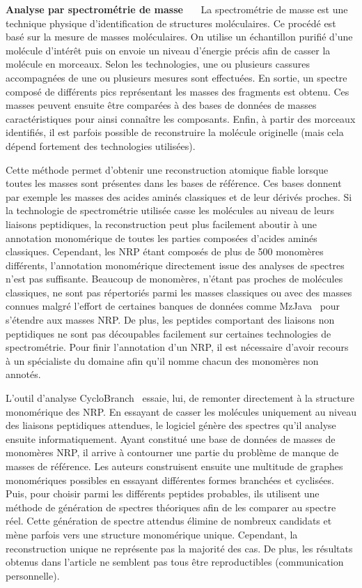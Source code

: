 \textbf{Analyse par spectrométrie de masse}~~~
La spectrométrie de masse est une technique physique d'identification de structures moléculaires.
Ce procédé est basé sur la mesure de masses moléculaires.
On utilise un échantillon purifié d'une molécule d'intérêt puis on envoie un niveau d'énergie précis afin de casser la molécule en morceaux.
Selon les technologies, une ou plusieurs cassures accompagnées de une ou plusieurs mesures sont effectuées.
En sortie, un spectre composé de différents pics représentant les masses des fragments est obtenu.
Ces masses peuvent ensuite être comparées à des bases de données de masses caractéristiques pour ainsi connaître les composants.
Enfin, à partir des morceaux identifiés, il est parfois possible de reconstruire la molécule originelle (mais cela dépend fortement des technologies utilisées).

Cette méthode permet d'obtenir une reconstruction atomique fiable lorsque toutes les masses sont présentes dans les bases de référence.
Ces bases donnent par exemple les masses des acides aminés classiques et de leur dérivés proches.
Si la technologie de spectrométrie utilisée casse les molécules au niveau de leurs liaisons peptidiques, la reconstruction peut plus facilement aboutir à une annotation monomérique de toutes les parties composées d'acides aminés classiques.
Cependant, les NRP étant composés de plus de 500 monomères différents, l'annotation monomérique directement issue des analyses de spectres n'est pas suffisante.
Beaucoup de monomères, n'étant pas proches de molécules classiques, ne sont pas répertoriés parmi les masses classiques ou avec des masses connues malgré l'effort de certaines banques de données comme MzJava~\cite{horlacher_mzjava:_2015} pour s'étendre aux masses NRP.
De plus, les peptides comportant des liaisons non peptidiques ne sont pas découpables facilement sur certaines technologies de spectrométrie.
Pour finir l'annotation d'un NRP, il est nécessaire d'avoir recours à un spécialiste du domaine afin qu'il nomme chacun des monomères non annotés.

L'outil d'analyse CycloBranch~\cite{novak_cyclobranch:_2015} essaie, lui, de remonter directement à la structure monomérique des NRP.
En essayant de casser les molécules uniquement au niveau des liaisons peptidiques attendues, le logiciel génère des spectres qu'il analyse ensuite informatiquement.
Ayant constitué une base de données de masses de monomères NRP, il arrive à contourner une partie du problème de manque de masses de référence.
Les auteurs construisent ensuite une multitude de graphes monomériques possibles en essayant différentes formes branchées et cyclisées.
Puis, pour choisir parmi les différents peptides probables, ils utilisent une méthode de génération de spectres théoriques afin de les comparer au spectre réel.
Cette génération de spectre attendus élimine de nombreux candidats et mène parfois vers une structure monomérique unique.
Cependant, la reconstruction unique ne représente pas la majorité des cas.
De plus, les résultats obtenus dans l'article ne semblent pas tous être reproductibles (communication personnelle).

